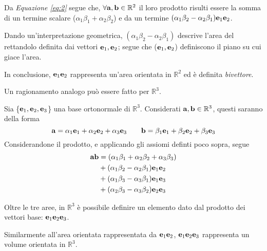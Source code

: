 \begin{frame}
    Da \emph{Equazione \eqref{eq:2}} segue che,
    \(\forall \mathbf{a}, \mathbf{b} \in \mathbb{R}^{2}\)
    il loro prodotto risulti essere la somma di un termine scalare
    (\(\alpha_{1}\beta_{1} + \alpha_{2}\beta_{2}\)) e da un termine 
    \((\alpha_{1}\beta_{2} - \alpha_{2}\beta_{1})\mathbf{e}_{1}\mathbf{e}_{2}\).

    Dando un'interpretazione geometrica, 
    \((\alpha_{1}\beta_{2} - \alpha_{2}\beta_{1})\) descrive l'area 
    del rettandolo definita dai vettori \(\mathbf{e}_{1}, \mathbf{e}_{2}\);
    segue che (\(\mathbf{e}_{1}, \mathbf{e}_{2}\)) definiscono il piano
    su cui giace l'area.

    In conclusione, \(\mathbf{e}_{1}\mathbf{e}_{2}\) rappresenta un'area 
    orientata in \(\mathbb{R}^{2}\) ed è definita \emph{bivettore}.
\end{frame}
\begin{frame}
    Un ragionamento analogo può essere fatto per \(\mathbb{R}^{3}\).

    Sia \{\(\mathbf{e}_{1}, \mathbf{e}_{2}, \mathbf{e}_{3}\)\} una base ortonormale
    di \(\mathbb{R}^{3}\). 
    Considerati \(\mathbf{a}, \mathbf{b} \in \mathbb{R}^{3}\),
    questi saranno della forma 
    \[
        \mathbf{a} = \alpha_{1}\mathbf{e}_{1} + \alpha_{2}\mathbf{e}_{2} 
            + \alpha_{3}\mathbf{e}_{3}  
            \qquad 
        \mathbf{b} = \beta_{1}\mathbf{e}_{1} + \beta_{2}\mathbf{e}_{2}
            + \beta_{3}\mathbf{e}_{3}
     \]
     Considerandone il prodotto, e applicando gli assiomi definti poco sopra,
     segue 
     \[\begin{aligned}
         \mathbf{ab} & = (\alpha_{1}\beta_{1} + \alpha_{2}\beta_{2} + \alpha_{3}\beta_{3}) \\ 
            & + (\alpha_{1}\beta_{2} - \alpha_{2}\beta_{1})\mathbf{e}_{1}\mathbf{e}_{2} \\
            & + (\alpha_{1}\beta_{3} - \alpha_{3}\beta_{1})\mathbf{e}_{1}\mathbf{e}_{3} \\
            & + (\alpha_{2}\beta_{3} - \alpha_{3}\beta_{2})\mathbf{e}_{2}\mathbf{e}_{3} \\
     \end{aligned}\]
\end{frame}
\begin{frame}
    Oltre le tre aree, in \(\mathbb{R}^{3}\) è possibile definire un elemento 
    dato dal prodotto dei vettori base: \(\mathbf{e}_{1}\mathbf{e}_{2}\mathbf{e}_{3}\).

    Similarmente all'area orientata rappresentata da \(\mathbf{e}_{1}\mathbf{e}_{2}\),
    \(\mathbf{e}_{1}\mathbf{e}_{2}\mathbf{e}_{3}\) rappresenta un volume orientata in 
    \(\mathbb{R}^{3}\).
\end{frame}
